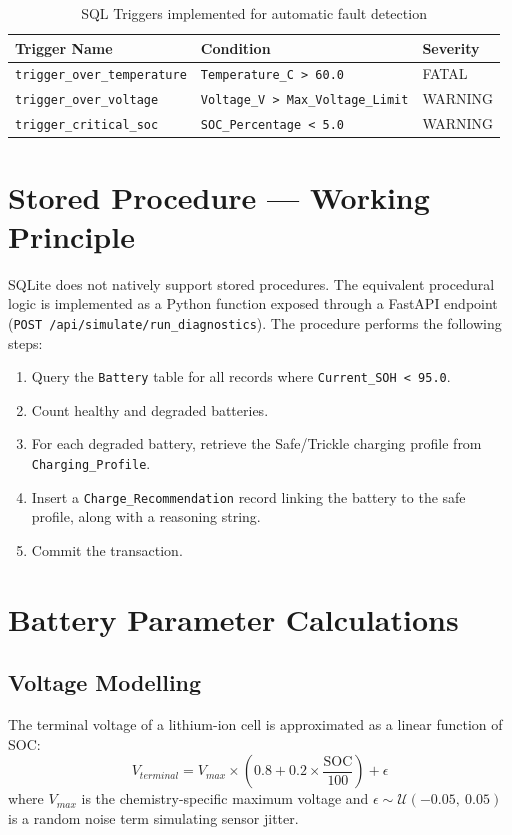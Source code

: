 \documentclass[12pt, a4paper]{report}
\begin{document}
\begin{table}[h]
    \centering
    \caption{SQL Triggers implemented for automatic fault detection}
    \begin{tabular}{@{} l l l @{}}
        \toprule
        \textbf{Trigger Name} & \textbf{Condition} & \textbf{Severity} \\
        \midrule
        \texttt{trigger\_over\_temperature} & \texttt{Temperature\_C > 60.0} & FATAL \\
        \texttt{trigger\_over\_voltage}     & \texttt{Voltage\_V > Max\_Voltage\_Limit} & WARNING \\
        \texttt{trigger\_critical\_soc}     & \texttt{SOC\_Percentage < 5.0} & WARNING \\
        \bottomrule
    \end{tabular}
    \label{tab:triggers}
\end{table}

\section{Stored Procedure — Working Principle}
SQLite does not natively support stored procedures. The equivalent procedural logic is implemented as a Python function exposed through a FastAPI endpoint (\texttt{POST /api/simulate/run\_diagnostics}). The procedure performs the following steps:

\begin{enumerate}
    \item Query the \texttt{Battery} table for all records where \texttt{Current\_SOH < 95.0}.
    \item Count healthy and degraded batteries.
    \item For each degraded battery, retrieve the Safe/Trickle charging profile from \texttt{Charging\_Profile}.
    \item Insert a \texttt{Charge\_Recommendation} record linking the battery to the safe profile, along with a reasoning string.
    \item Commit the transaction.
\end{enumerate}

\section{Battery Parameter Calculations}
\subsection{Voltage Modelling}
The terminal voltage of a lithium-ion cell is approximated as a linear function of SOC:
\begin{equation}
    V_{terminal} = V_{max} \times \left(0.8 + 0.2 \times \frac{\text{SOC}}{100}\right) + \epsilon
    \label{eq:voltage}
\end{equation}
where $V_{max}$ is the chemistry-specific maximum voltage and $\epsilon \sim \mathcal{U}(-0.05,\ 0.05)$ is a random noise term simulating sensor jitter.
\end{document}
